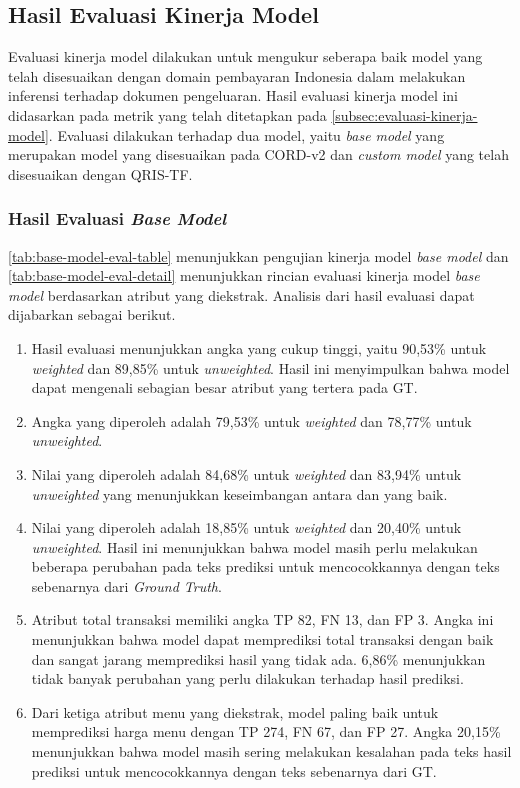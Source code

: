 \subsection{Hasil Evaluasi Kinerja Model}
\label{subsec:hasil-evaluasi-kinerja-model}

Evaluasi kinerja model dilakukan untuk mengukur seberapa baik model \donut{} yang telah disesuaikan dengan domain pembayaran Indonesia dalam melakukan inferensi terhadap dokumen pengeluaran. 
Hasil evaluasi kinerja model ini didasarkan pada metrik yang telah ditetapkan pada \autoref{subsec:evaluasi-kinerja-model}. Evaluasi dilakukan terhadap dua model, yaitu \emph{base model} yang merupakan model \donut{} yang disesuaikan pada \dataset{} CORD-v2 dan \emph{custom model} yang telah disesuaikan dengan \dataset{} QRIS-TF.

\subsubsection{Hasil Evaluasi \emph{Base Model}}
\label{subsubsec:hasil-evaluasi-base-model}
\autoref{tab:base-model-eval-table} menunjukkan pengujian kinerja model \emph{base model} dan \autoref{tab:base-model-eval-detail} menunjukkan rincian evaluasi kinerja model \emph{base model} berdasarkan atribut yang diekstrak. Analisis dari hasil evaluasi dapat dijabarkan sebagai berikut.
\begin{enumerate}
    \item Hasil evaluasi menunjukkan angka \precision{} yang cukup tinggi, yaitu 90,53\% untuk \emph{weighted} dan 89,85\% untuk \emph{unweighted}. Hasil ini menyimpulkan bahwa model dapat mengenali sebagian besar atribut yang tertera pada GT.
    \item Angka \recall{} yang diperoleh adalah 79,53\% untuk \emph{weighted} dan 78,77\% untuk \emph{unweighted}. 
    \item Nilai \fscore{} yang diperoleh adalah 84,68\% untuk \emph{weighted} dan 83,94\% untuk \emph{unweighted} yang menunjukkan keseimbangan antara \precision{} dan \recall{} yang baik.
    \item Nilai \mcer{} yang diperoleh adalah 18,85\% untuk \emph{weighted} dan 20,40\% untuk \emph{unweighted}. Hasil ini menunjukkan bahwa model masih perlu melakukan beberapa perubahan pada teks prediksi untuk mencocokkannya dengan teks sebenarnya dari \emph{Ground Truth}.
    \item Atribut total transaksi memiliki angka TP 82, FN 13, dan FP 3. Angka ini menunjukkan bahwa model dapat memprediksi total transaksi dengan baik dan sangat jarang memprediksi hasil yang tidak ada. \mcer{} 6,86\% menunjukkan tidak banyak perubahan yang perlu dilakukan terhadap hasil prediksi. 
    \item Dari ketiga atribut menu yang diekstrak, model paling baik untuk memprediksi harga menu dengan TP 274, FN 67, dan FP 27. Angka \mcer{} 20,15\% menunjukkan bahwa model masih sering melakukan kesalahan pada teks hasil prediksi untuk mencocokkannya dengan teks sebenarnya dari GT.
\end{enumerate}

